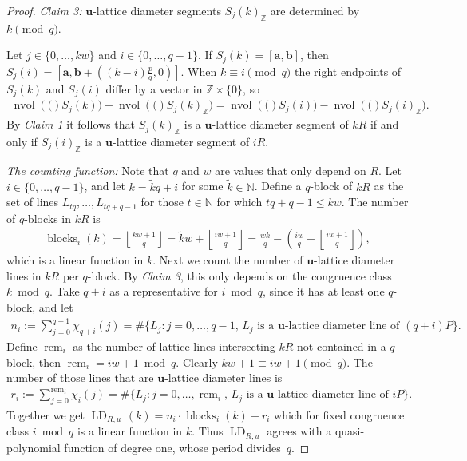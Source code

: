 \documentclass[10pt,a4paper]{amsart}
\DeclareMathOperator{\LD}{LD}
\DeclareMathOperator{\blocks}{blocks}
\DeclareMathOperator{\rem}{rem}
\newcommand{\N}{\mathbb{N}}
\newcommand{\Z}{\mathbb{Z}}
\newcommand{\ba}{\mathbf{a}}
\newcommand{\bb}{\mathbf{b}}
\newcommand{\bu}{\mathbf{u}}
\newcommand{\lp}{\left(}
\newcommand{\nvol}[1]{\operatorname{nvol}\left(#1\right)}
\newcommand{\rp}{\right)}
\begin{document}
\begin{proof}
    \textit{Claim 3:} $\bu$-lattice diameter segments $S_j(k)_\Z$ are determined by $k \pmod q$.
    
    Let $j \in \{0, \ldots, kw\}$ and $i \in \{0, \ldots, q-1\}$. If $S_j(k) = [\ba,\bb]$, then $S_j(i) = [\ba,\bb + ((k-i)\frac{p}{q},0)]$. When $k \equiv i \pmod q$ the right endpoints of $S_j(k)$ and $S_j(i)$ differ by a vector in $\Z \times \{0\}$, so
    \begin{align*}
         \nvol(S_j(k))-\nvol(S_j(k)_\Z)=\nvol(S_j(i))-\nvol(S_j(i)_\Z).
    \end{align*}
    By \textit{Claim 1} it follows that $S_j(k)_\Z$ is a $\bu$-lattice diameter segment of $kR$ if and only if $S_j(i)_\Z$ is a $\bu$-lattice diameter segment of $iR$.
    
    \textit{The counting function:} Note that $q$ and $w$ are values that only depend on $R$. Let $i \in \{0, \ldots, q-1\}$, and let $k=\tilde{k}q+i$ for some $\tilde{k} \in \N$. Define a $q$-block of $kR$ as the set of lines $L_{tq}, \ldots, L_{tq+q-1}$ for those $t \in \N$ for which $tq+q-1 \leq kw$. The number of $q$-blocks in $kR$ is
    \begin{align*}
         \blocks_i(k)  = \left \lfloor  \frac{kw+1}{q} \right\rfloor = \tilde{k}w + \left\lfloor \frac{iw+1}{q}\right\rfloor = \frac{wk}{q}  - \lp \frac{iw}{q} - \left\lfloor \frac{iw+1}{q} \right\rfloor \rp,
    \end{align*}
    which is a linear function in $k$. Next we count the number of $\bu$-lattice diameter lines in $kR$ per $q$-block. By \textit{Claim 3}, this only depends on the congruence class $k \bmod q$. Take $q+i$ as a representative for $i \bmod q$,
    since it has at least one $q$-block, and let
    \begin{align*}
        n_i := \sum_{j=0}^{q-1}\chi_{q+i}(j) = \# \{  L_j: j =0, \ldots, q-1,\, L_j \text{ is a $\bu$-lattice diameter line of } (q+i)P\}.
    \end{align*}
    Define $\rem_i$ as the number of lattice lines intersecting $kR$ not contained in a $q$-block, then $\rem_i= iw+1 \bmod q$. Clearly $kw +1 \equiv iw+1 \pmod q$. 
    The number of those lines that are $\bu$-lattice diameter lines is
    \begin{align*}
        r_i := \sum_{j=0}^{\rem_i} \chi_{i}(j)  = \# \{  L_j: j =0, \ldots, \rem_i, \, L_j \text{ is a $\bu$-lattice diameter line of } iP\}.
    \end{align*}
    Together we get $\LD_{R,u\,}(k) = n_i \cdot \blocks_{i}(k) + r_i$ which for fixed congruence class $ i \bmod q$ is a linear function in $k$. Thus $\LD_{R,u}$ agrees with a quasi-polynomial function of degree one, whose period \mbox{divides $q$}.
\end{proof}
\end{document}
